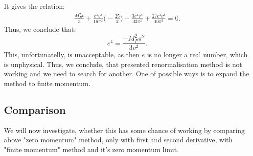 It gives the relation:
\begin{align}
\frac{M_P^2v}{3}+\frac{e^4v^3}{16\pi^2}\Big(-\frac{25}{2}\Big)+\frac{3e^4v^3}{32\pi^2}+
\frac{27e^4v^3}{16\pi^2} = 0.
\end{align}
Thus, we conclude that: 
\begin{equation}
e^4=\frac{-M_P^2\pi^2}{3v^2}.
\end{equation}
This, unfortunatelly, is unacceptable, as then $e$ is no longer a real number, which is 
unphysical.
Thus, we conclude, that presented renormalisation method is not working and we need to search for 
another. One of possible ways is to expand the method to finite momentum. \\

\subsection{Comparison}
We will now investigate, whether this has some chance of working by comparing 
above "zero momentum" method, only with first and second derivative, with "finite momentum" 
method and it's zero momentum limit. \\

